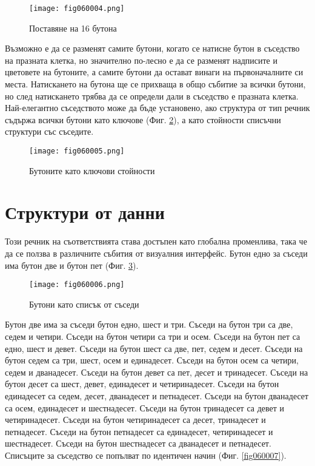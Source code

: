 \begin{figure}[H]
  \centering
  \texttt{[image: fig060004.png]}
  \caption{Поставяне на 16 бутона}
\label{fig060004}
\end{figure}

Възможно е да се разменят самите бутони, когато се натисне бутон в съседство на празната клетка, но значително по-лесно е да се разменят надписите и цветовете на бутоните, а самите бутони да остават винаги на първоначалните си места. Натискането на бутона ще се прихваща в общо събитие за всички бутони, но след натискането трябва да се определи дали в съседство е празната клетка. Най-елегантно съседството може да бъде установено, ако структура от тип речник съдържа всички бутони като ключове (Фиг. \ref{fig060005}), а като стойности списъчни структури със съседите.

\begin{figure}[H]
  \centering
  \texttt{[image: fig060005.png]}
  \caption{Бутоните като ключови стойности}
\label{fig060005}
\end{figure}

\section{Структури от данни}

Този речник на съответствията става достъпен като глобална променлива, така че да се ползва в различните събития от визуалния интерфейс. Бутон едно за съседи има бутон две и бутон пет  (Фиг. \ref{fig060006}). 

\begin{figure}[H]
  \centering
  \texttt{[image: fig060006.png]}
  \caption{Бутони като списък от съседи}
\label{fig060006}
\end{figure}

Бутон две има за съседи бутон едно, шест и три. Съседи на бутон три са две, седем и четири. Съседи на бутон четири са три и осем. Съседи на бутон пет са едно, шест и девет. Съседи на бутон шест са две, пет, седем и десет. Съседи на бутон седем са три, шест, осем и единадесет. Съседи на бутон осем са четири, седем и дванадесет. Съседи на бутон девет са пет, десет и тринадесет. Съседи на бутон десет са шест, девет, единадесет и четиринадесет. Съседи на бутон единадесет са седем, десет, дванадесет и петнадесет. Съседи на бутон дванадесет са осем, единадесет и шестнадесет. Съседи на бутон тринадесет са девет и четиринадесет. Съседи на бутон четиринадесет са десет, тринадесет и петнадесет. Съседи на бутон петнадесет са единадесет, четиринадесет и шестнадесет. Съседи на бутон шестнадесет са дванадесет и петнадесет. Списъците за съседство се попълват по идентичен начин (Фиг. \ref{fig060007}).

